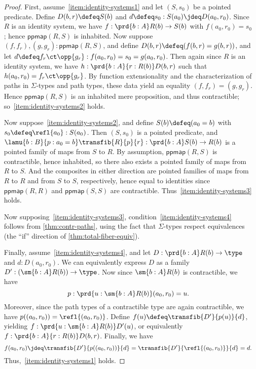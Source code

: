 \begin{proof}
  First, assume~\ref{item:identity-systems1} and let $(S,s_0)$ be a pointed predicate.
  Define $D(b,r) \defeq S(b)$ and $d\defeq s_0: S(a_0) \jdeq D(a_0,r_0)$.
  Since $R$ is an identity system, we have $f:\prd{b:A} R(b) \to S(b)$ with $f(a_0,r_0) = s_0$; hence $\mathsf{ppmap}(R,S)$ is inhabited.
  Now suppose $(f,f_r),(g,g_r) : \mathsf{ppmap}(R,S)$, and define $D(b,r) \defeq (f(b,r) = g(b,r))$, and let $d \defeq f_r \ct \opp{g_r} : f(a_0,r_0) = s_0 = g(a_0,r_0)$.
  Then again since $R$ is an identity system, we have $h:\prd{b:A}{r:R(b)} D(b,r)$ such that $h(a_0,r_0) = f_r \ct \opp{g_r}$.
  By function extensionality and the characterization of paths in $\Sigma$-types and path types, these data yield an equality $(f,f_r) = (g,g_r)$.
  Hence $\mathsf{ppmap}(R,S)$ is an inhabited mere proposition, and thus contractible; so~\ref{item:identity-systems2} holds.

  Now suppose~\ref{item:identity-systems2}, and define $S(b) \defeq (a_0=b)$ with $s_0 \defeq \refl{a_0}:S(a_0)$.
  Then $(S,s_0)$ is a pointed predicate, and $\lamu{b:B}{p:a_0=b} \transfib{R}{p}{r} : \prd{b:A} S(b) \to R(b)$ is a pointed family of maps from $S$ to $R$.
  By assumption, $\mathsf{ppmap}(R,S)$ is contractible, hence inhabited, so there also exists a pointed family of maps from $R$ to $S$.
  And the composites in either direction are pointed families of maps from $R$ to $R$ and from $S$ to $S$, respectively, hence equal to identities since $\mathsf{ppmap}(R,R)$ and $\mathsf{ppmap}(S,S)$ are contractible.
  Thus~\ref{item:identity-systems3} holds.

  Now supposing~\ref{item:identity-systems3}, condition~\ref{item:identity-systems4} follows from \cref{thm:contr-paths}, using the fact that $\Sigma$-types respect equivalences (the ``if'' direction of \cref{thm:total-fiber-equiv}).

  Finally, assume~\ref{item:identity-systems4}, and let $D:\prd{b:A} R(b)\to  \type$ and $d:D(a_0,r_0)$.
  We can equivalently express $D$ as a family $D':(\sm{b:A} R(b)) \to \type$.
  Now since $\sm{b:A} R(b)$ is contractible, we have
  \[p:\prd{u:\sm{b:A} R(b)} (a_0,r_0) = u. \]
  Moreover, since the path types of a contractible type are again contractible, we have $p((a_0,r_0)) = \refl{(a_0,r_0)}$.
  Define $f(u) \defeq \transfib{D'}{p(u)}{d}$, yielding $f:\prd{u:\sm{b:A} R(b)} D'(u)$, or equivalently $f:\prd{b:A}{r:R(b)} D(b,r)$.
  Finally, we have
  \[f(a_0,r_0) \jdeq \transfib{D'}{p((a_0,r_0))}{d} = \transfib{D'}{\refl{(a_0,r_0)}}{d} = d.\]
  Thus,~\ref{item:identity-systems1} holds.
\end{proof}

